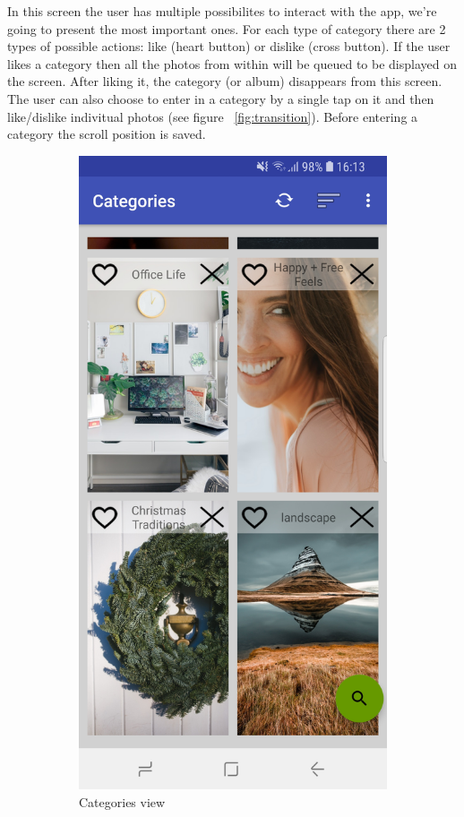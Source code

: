 \documentclass[version=last,fontsize=13pt]{scrartcl}
\begin{document}
	In this screen the user has multiple possibilites to interact with the app, we're going to present the most important ones. For each type of category there are 2 types of possible actions: like (heart button) or dislike (cross button). If the user likes a category then all the photos from within will be queued to be displayed on the screen. After liking it, the category (or album) disappears from this screen. The user can also choose to enter in a category by a single tap on it and then like/dislike indivitual photos (see figure ~\ref{fig:transition}). Before entering a category the scroll position is saved.


\begin{figure}
\centering
\begin{subfigure}{.5\textwidth}
  \centering
  \includegraphics[width=.45\linewidth]{imgs/Categories.jpg}
  \caption{Categories view}
  \label{fig:sub1}
\end{subfigure}%
\begin{subfigure}{.5\textwidth}
  \centering

\end{subfigure}
\end{figure}
\end{document}
